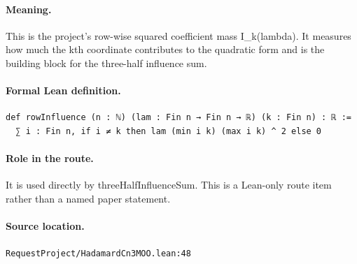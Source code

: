 \medskip
\paragraph{Meaning.}
This is the project's row-wise squared coefficient mass I\_k(lambda). It measures how much the kth coordinate contributes to the quadratic form and is the building block for the three-half influence sum.
\paragraph{Formal Lean definition.}
\begin{verbatim}
def rowInfluence (n : ℕ) (lam : Fin n → Fin n → ℝ) (k : Fin n) : ℝ :=
  ∑ i : Fin n, if i ≠ k then lam (min i k) (max i k) ^ 2 else 0
\end{verbatim}
\paragraph{Role in the route.}
It is used directly by threeHalfInfluenceSum. This is a Lean-only route item rather than a named paper statement.
\paragraph{Source location.}
\texttt{RequestProject/HadamardCn3MOO.lean:48}
\medskip
